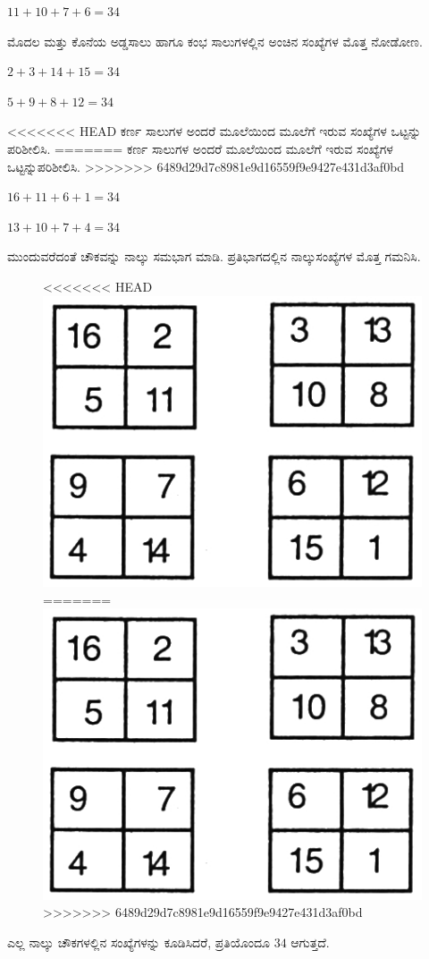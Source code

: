 $11+10+7+6 = 34$

ಮೊದಲ ಮತ್ತು ಕೊನೆಯ ಅಡ್ಡಸಾಲು ಹಾಗೂ ಕಂಭ ಸಾಲುಗಳಲ್ಲಿನ ಅಂಚಿನ ಸಂಖ್ಯೆಗಳ ಮೊತ್ತ ನೋಡೋಣ.

$2+3+14+15 = 34$

$5+9+8+12 = 34$

<<<<<<< HEAD
\noindent 
ಕರ್ಣ ಸಾಲುಗಳ ಅಂದರೆ ಮೂಲೆಯಿಂದ ಮೂಲೆಗೆ ಇರುವ ಸಂಖ್ಯೆಗಳ ಒಟ್ಟನ್ನು ಪರಿಶೀಲಿಸಿ.
=======
ಕರ್ಣ ಸಾಲುಗಳ ಅಂದರೆ ಮೂಲೆಯಿಂದ ಮೂಲೆಗೆ ಇರುವ ಸಂಖ್ಯೆಗಳ ಒಟ್ಟನ್ನು\break ಪರಿಶೀಲಿಸಿ.
>>>>>>> 6489d29d7c8981e9d16559f9e9427e431d3af0bd

$16+11+6+1 = 34$

$13+10+7+4 = 34$

ಮುಂದುವರೆದಂತೆ ಚೌಕವನ್ನು ನಾಲ್ಕು ಸಮಭಾಗ ಮಾಡಿ. ಪ್ರತಿಭಾಗದಲ್ಲಿನ ನಾಲ್ಕು\break ಸಂಖ್ಯೆಗಳ ಮೊತ್ತ ಗಮನಿಸಿ.
\begin{figure}[H]
<<<<<<< HEAD
\includegraphics{src/figures/chap1/fig1-2.jpg}
=======
\includegraphics[scale=.9]{src/figures/chap1/fig1.2.jpg}
>>>>>>> 6489d29d7c8981e9d16559f9e9427e431d3af0bd
\end{figure}
ಎಲ್ಲ ನಾಲ್ಕು ಚೌಕಗಳಲ್ಲಿನ ಸಂಖ್ಯೆಗಳನ್ನು ಕೂಡಿಸಿದರೆ, ಪ್ರತಿಯೊಂದೂ $34$ ಆಗುತ್ತದೆ.

